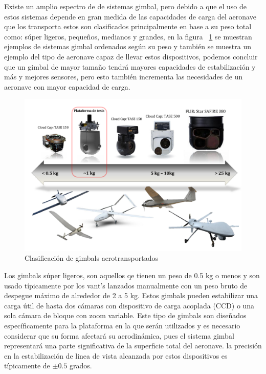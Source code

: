 Existe un amplio espectro de de sistemas gimbal, pero debido a que el uso de estos sistemas depende en gran medida de las capacidades de carga del aeronave que los transporta estos son clasificados principalmente en base a su peso total como: s\'{u}per ligeros, peque\~{n}os, medianos y grandes, en la figura ~\ref{fig:CamClases} se muestran ejemplos de sistemas gimbal ordenados seg\'{u}n su peso y tambi\'{e}n se muestra un ejemplo del tipo de aeronave capaz de llevar estos dispositivos, podemos concluir que un gimbal de mayor tama\~{n}o tendr\'{a} mayores capacidades de estabilizaci\'{o}n y m\'{a}s y mejores sensores, pero esto tambi\'{e}n incrementa las necesidades de un aeronave con mayor capacidad de carga.

\begin{figure}[h]
\centering \includegraphics[scale=0.8]{img/Gimbalclases1.pdf}
\caption{Clasificaci\'{o}n de gimbals aerotransportados}%
\label{fig:CamClases}
\end{figure}

Los gimbals s\'{u}per ligeros, son aquellos qe tienen un peso de 0.5 kg o menos y son usado t\'{i}picamente por los vant's lanzados manualmente con un peso bruto de despegue m\'{a}ximo de alrededor de 2 a 5 kg. Estos gimbals pueden estabilizar una carga \'{u}til de hasta dos c\'{a}maras con dispositivo de carga acoplada (CCD) o una sola c\'{a}mara de bloque con zoom variable. Este tipo de gimbals son dise\~{n}ados espec\'{i}ficamente para la plataforma en la que ser\'{a}n utilizados y es necesario considerar que su forma afectar\'{a} su aerodin\'{a}mica, pues el sistema gimbal representar\'{a} una parte significativa de la superficie total del aeronave. la precisi\'{o}n en la estabilizaci\'{o}n de linea de vista alcanzada por estos dispositivos es t\'{i}picamente de $\pm0.5$ grados.

